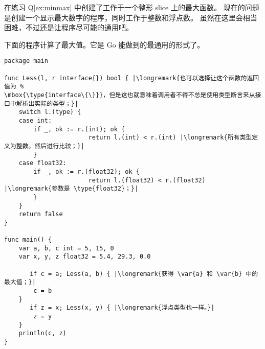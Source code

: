 \begin{Exercise}[title={接口和 max()},difficulty=2]
\Question
在练习 Q\ref{ex:minmax} 中创建了工作于一个整形 slice 上的最大函数。
现在的问题是创建一个显示最大数字的程序，同时工作于整数和浮点数。
虽然在这里会相当困难，不过还是让程序尽可能的通用吧。
\end{Exercise}

\begin{Answer}
\Question
下面的程序计算了最大值。它是 Go 能做到的最通用的形式了。

\begin{lstlisting}[caption=通用的计算最大值]
package main

func Less(l, r interface{}) bool { |\longremark{也可以选择让这个函数的返回值为 %
\mbox{\type{interface\{\}}}，但是这也就意味着调用者不得不总是使用类型断言来从接口中解析出实际的类型；}|
	switch l.(type) {
	case int:
		if _, ok := r.(int); ok {
                       return l.(int) < r.(int) |\longremark{所有类型定义为整数。然后进行比较；}|
		}
	case float32:
		if _, ok := r.(float32); ok {
                       return l.(float32) < r.(float32) |\longremark{参数是 \type{float32}；}|
		}
	}
	return false
}

func main() {
	var a, b, c int = 5, 15, 0
	var x, y, z float32 = 5.4, 29.3, 0.0

       if c = a; Less(a, b) { |\longremark{获得 \var{a} 和 \var{b} 中的最大值；}|
		c = b
	}
       if z = x; Less(x, y) { |\longremark{浮点类型也一样。}|
		z = y
	}
	println(c, z)
}
\end{lstlisting}
\showremarks
\end{Answer}
